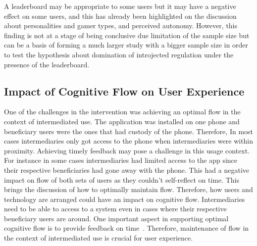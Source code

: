 A leaderboard may be appropriate to some users but it may have a negative effect on some users, and this has already been highlighted on the discussion about personalities and gamer types, and perceived autonomy. However, this finding is not at a stage of being conclusive due limitation of the sample size but can be a basis of forming a much larger study with a bigger sample size in order to test the hypothesis about domination of introjected regulation under the presence of the leaderboard.

\subsection{Impact of Cognitive Flow on User Experience}
One of the challenges in the intervention was achieving an optimal flow in the context of intermediated use. The application was installed on one phone and beneficiary users were the ones that had custody of the phone. Therefore, In most cases intermediaries only got access to the phone when intermediaries were within proximity. Achieving timely feedback may pose a challenge in this usage context. For instance in some cases intermediaries had limited access to the app since their respective beneficiaries had gone away with the phone. This had a negative impact on flow of both sets of users as they couldn't self-reflect on time. This brings the discussion of how to optimally maintain flow. Therefore, how users and technology are arranged could have an impact on cognitive flow. Intermediaries need to be able to access to a system even in cases where their respective beneficiary users are around. One important aspect in supporting optimal cognitive flow is to provide feedback on time~\citep{csikszentmihalyiflow}. Therefore, maintenance of flow in the context of intermediated use is crucial for user experience. 
\begin{flushright}
\end{flushright}

